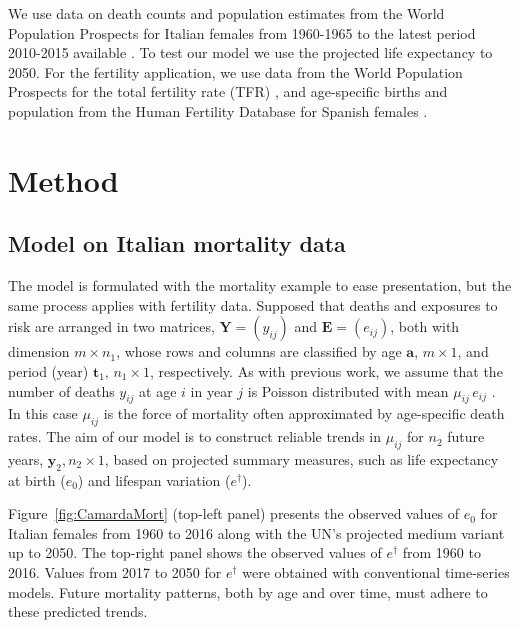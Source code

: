 \documentclass[12pt,a4paper,twoside]{article}
\begin{document}
We use data on death counts and population estimates from the World Population Prospects for Italian females from 1960-1965 to the latest period 2010-2015 available \citep{UN2019}. To test our model we use the projected life expectancy to 2050. For the fertility application, we use data from the World Population Prospects for the total fertility rate (TFR) \citep{UN2019}, and age-specific births and population from the Human Fertility Database for Spanish females \citep{HFD}.


\section{Method}

\subsection{Model on Italian mortality data}
The model is formulated with the mortality example to ease presentation, but the same process applies with fertility data. Supposed that deaths and exposures to risk are arranged in two matrices, 
$\bm{Y} = (y_{ij})$ and $\bm{E} = (e_{ij})$, both with dimension $m \times n_{1}$, whose rows and columns are classified by age $\bm{a}, \,m \times 1$, and period (year) $\bm{t}_{1}, \,n_{1} \times 1$, respectively.  As with previous work, we assume that the number of deaths $y_{ij}$ at age $i$ in year $j$ is Poisson distributed with mean $\mu_{ij} \,e_{ij}$ \citep{camarda2019smooth}. In this case $\mu_{ij}$ is the force of mortality often approximated by age-specific death rates. The aim of our model is to construct reliable trends in $\mu_{ij}$ for $n_{2}$ future years, $\bm{y}_{2}, n_{2} \times 1$, based on projected summary measures, such as life expectancy at birth ($e_{0}$) and lifespan variation ($e^\dagger$).

Figure~\ref{fig:CamardaMort} (top-left panel) presents the observed values of $e_{0}$ for Italian females from 1960 to 2016 along with the UN's projected medium variant up to 2050. The top-right panel shows the observed values of $e^{\dagger}$ from 1960 to 2016. Values from 2017 to 2050 for $e^\dagger$ were obtained with conventional time-series models. Future mortality patterns, both by age and over time, must adhere to these predicted trends.
\end{document}
